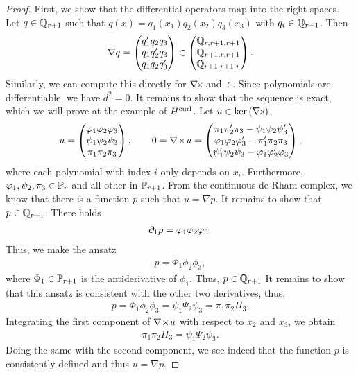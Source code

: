 \begin{proof}
  First, we show that the differential operators map into the right
  spaces. Let $q\in\Q_{r+1}$ such that
  $q(x) = q_1(x_1) q_2(x_2)q_3(x_3)$ with $q_i\in\Q_{r+1}$. Then
  \begin{gather*}
    \nabla q =
    \begin{pmatrix}
      q_1'q_2q_3\\q_1q_2'q_3\\q_1q_2q_3'
    \end{pmatrix}
    \in
    \begin{pmatrix}
      \Q_{r,r+1,r+1}\\\Q_{r+1,r,r+1}\\\Q_{r+1,r+1,r}
    \end{pmatrix}.
  \end{gather*}
  Similarly, we can compute this directly for $\curl$ and
  $\div$. Since polynomials are differentiable, we have $d^2=0$. It
  remains to show that the sequence is exact, which we will prove at
  the example of $\Hcurl$. Let $u\in \ker{\curl}$,
  \begin{gather*}
    u=
    \begin{pmatrix}
      \phi_1\phi_2\phi_3\\
      \psi_1\psi_2\psi_3\\
      \pi_1\pi_2\pi_3
    \end{pmatrix},
    \qquad
    0 = \curl u =
    \begin{pmatrix}
      \pi_1\pi_2'\pi_3 - \psi_1\psi_2\psi_3'\\
      \phi_1\phi_2\phi_3' - \pi_1'\pi_2\pi_3\\
      \psi_1'\psi_2\psi_3 - \phi_1\phi_2'\phi_3
    \end{pmatrix},
  \end{gather*}
  where each polynomial with index $i$ only depends on
  $x_i$. Furthermore, $\phi_1,\psi_2,\pi_3\in\P_r$ and all other in
  $\P_{r+1}$.  From the continuous de Rham complex, we know that there
  is a function $p$ such that $u=\nabla p$. It remains to show that
  $p\in\Q_{r+1}$. There holds
  \begin{gather*}
    \d_1 p = \phi_1\phi_2\phi_3.
  \end{gather*}
  Thus, we make the ansatz
  \begin{gather*}
    p = \Phi_1\phi_2\phi_3,
  \end{gather*}
  where $\Phi_1\in\P_{r+1}$ is the antiderivative of $\phi_1$. Thus,
  $p\in\Q_{r+1}$ It remains to show that this ansatz is consistent
  with the other two derivatives, thus,
  \begin{gather*}
    p = \Phi_1\phi_2\phi_3 = \psi_1\Psi_2\psi_3 = \pi_1\pi_2\Pi_3.
  \end{gather*}
  Integrating the first component of $\curl u$ with respect to $x_2$
  and $x_3$, we obtain
  \begin{gather*}
    \pi_1\pi_2\Pi_3 = \psi_1\Psi_2\psi_3.
  \end{gather*}
  Doing the same with the second component, we see indeed that the
  function $p$ is consistently defined and thus $u=\nabla p$.
\end{proof}


